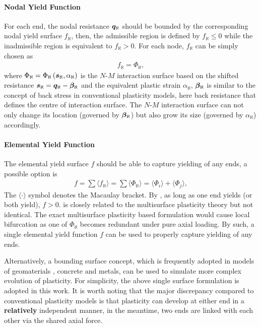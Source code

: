 \paragraph{Nodal Yield Function}
For each end, the nodal resistance $\bm{q}_\aleph$ should be bounded by the corresponding nodal yield surface $f_\aleph$, then, the admissible region is defined by $f_\aleph\leqslant0$ while the inadmissible region is equivalent to $f_\aleph>0$.
For each node, $f_\aleph$ can be simply chosen as
\begin{gather}
f_\aleph=\Phi_\aleph,
\end{gather}
where $\Phi_\aleph=\Phi_\aleph\left(\bm{s}_\aleph,\alpha_\aleph\right)$ is the $N$-$M$ interaction surface based on the shifted resistance $\bm{s}_\aleph=\bm{q}_\aleph-\bm{\beta}_\aleph$ and the equivalent plastic strain $\alpha_\aleph$, $\bm{\beta}_\aleph$ is similar to the concept of back stress in conventional plasticity models, here back resistance that defines the centre of interaction surface.
The $N$-$M$ interaction surface can not only change its location (governed by $\bm{\beta}_\aleph$) but also grow its size (governed by $\alpha_\aleph$) accordingly.
\paragraph{Elemental Yield Function}
The elemental yield surface $f$ should be able to capture yielding of any ends, a possible option is
\begin{gather}\label{eq:nm_yield}
f=\sum{}\langle{}f_\aleph\rangle=\sum\langle\Phi_\aleph\rangle=\langle\Phi_i\rangle+\langle\Phi_j\rangle,
\end{gather}
The $\langle\cdot\rangle$ symbol denotes the Macaulay bracket.
By , as long as one end yields (or both yield), $f>0$.  is closely related to the multisurface plasticity theory \cite{Simo1998} but not identical.
The exact multisurface plasticity based formulation \cite{Kostic2013} would cause local bifurcation as one of $\Phi_\aleph$ becomes redundant under pure axial loading.
By such, a single elemental yield function $f$ can be used to properly capture yielding of any ends.

Alternatively, a bounding surface concept, which is frequently adopted in models of geomaterials \cite{Dafalias2004}, concrete and metals, can be used to simulate more complex evolution of plasticity.
For simplicity, the above single surface formulation is adopted in this work.
It is worth noting that the major discrepancy compared to conventional plasticity models is that plasticity can develop at either end in a \textbf{relatively} independent manner, in the meantime, two ends are linked with each other via the shared axial force.


